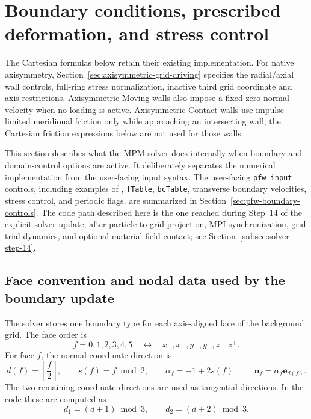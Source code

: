 
\section{Boundary conditions, prescribed deformation, and stress control}
\label{sec:bc-internals}

The Cartesian formulas below retain their existing implementation. For native
axisymmetry, Section~\ref{sec:axisymmetric-grid-driving} specifies the radial/axial
wall controls, full-ring stress normalization, inactive third grid coordinate
and axis restrictions. Axisymmetric Moving walls also impose a fixed zero
normal velocity when no loading is active. Axisymmetric Contact walls use
impulse-limited meridional friction only while approaching an intersecting wall;
the Cartesian friction expressions below are not used for those walls.


This section describes what the MPM solver does internally when boundary and domain-control options are active.  It deliberately separates the numerical implementation from the user-facing input syntax.  The user-facing \texttt{pfw\_input} controls, including examples of , \texttt{fTable}, \texttt{bcTable}, transverse boundary velocities, stress control, and periodic flags, are summarized in Section~\ref{sec:pfw-boundary-controls}.  The code path described here is the one reached during Step~14 of the explicit solver update, after particle-to-grid projection, MPI synchronization, grid trial dynamics, and optional material-field contact; see Section~\ref{subsec:solver-step-14}.

\subsection{Face convention and nodal data used by the boundary update}
\label{subsec:bc-face-convention}

The solver stores one boundary type for each axis-aligned face of the background grid.  The face order is
\begin{equation}
  f=0,1,2,3,4,5
  \quad\leftrightarrow\quad
  x^-,x^+,y^-,y^+,z^-,z^+.
\end{equation}
For face $f$, the normal coordinate direction is
\begin{equation}
  d(f)=\left\lfloor \frac{f}{2}\right\rfloor,
  \qquad
  s(f)=f\bmod 2,
  \qquad
  \alpha_f=-1+2s(f),
  \qquad
  \mathbf{n}_f=\alpha_f\mathbf{e}_{d(f)}.
  \label{eq:bc-face-normal}
\end{equation}
The two remaining coordinate directions are used as tangential directions.  In the code these are computed as
\begin{equation}
  d_1=(d+1)\bmod 3,
  \qquad
  d_2=(d+2)\bmod 3.
\end{equation}

